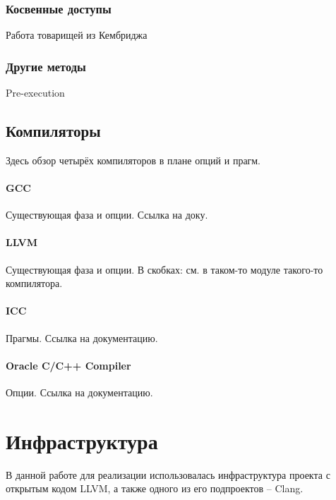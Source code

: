 \documentclass[12pt,a4paper]{article}
\begin{document}
\subsubsection{Косвенные доступы}
Работа товарищей из Кембриджа

\subsubsection{Другие методы}
Pre-execution

\subsection{Компиляторы}

Здесь обзор четырёх компиляторов в плане опций и прагм.

\paragraph{GCC}

Существующая фаза и опции. Ссылка на доку.

\paragraph{LLVM}

Существующая фаза и опции. В скобках: см. в таком-то модуле такого-то компилятора.

\paragraph{ICC}

Прагмы. Ссылка на документацию.

\paragraph{Oracle C/C++ Compiler}

Опции. Ссылка на документацию.

\section{Инфраструктура}

В данной работе для реализации использовалась инфраструктура проекта с открытым кодом LLVM, а также одного из его подпроектов -- Clang.
\end{document}
